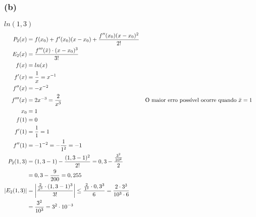 \documentclass{article}
\begin{document}
\subsubsection{(b)}
$ln(1,3)$
\begin{align}
  P_2(x)
  &= f(x_0) + f'(x_0)(x-x_0) + \frac{f''(x_0)(x-x_0)^2} {2!} \\
  E_2(x)
  &= \frac{f'''(\bar{x}) \cdot (x-x_0)^3}{3!} \\
  f(x)
  &= ln(x) \\
  f'(x)
  &= \frac{1}{x}
  = x^{-1} \\
  f''(x)
  &= -x^{-2} \\
  f'''(x)
  &= 2x^{-3}
  = \frac{2}{x^3}
  && \text{O maior erro possível ocorre quando $\bar{x} = 1$} \\
  x_0
  &= 1 \\
  f(1)
  &= 0 \\
  f'(1)
  &= \frac{1}{1}
  = 1 \\
  f''(1)
  &= -1^{-2}
  = -\frac{1}{1^2}
  = -1 \\
  P_2(1,3)
  &= (1,3 - 1) -\frac{(1,3 - 1)^2}{2!}
  = 0,3 - \frac{\frac{3^2}{10^2}}{2} \\
  &= 0,3 -\frac{9}{200}
  = 0,255 \notag \\
  |E_2(1,3)|
  &= \left|\frac{\frac{2}{\bar{x}^3} \cdot (1,3 - 1)^3}{3!}\right|
  \leq \frac{\frac{2}{1^3} \cdot 0,3^3}{6}
  = \frac{2 \cdot 3^3}{10^3 \cdot 6} \\
  &= \frac{3^2}{10^3}
  = 3^2 \cdot 10^{-3} \notag
\end{align}
\setcounter{equation}{0}
\clearpage
\end{document}
